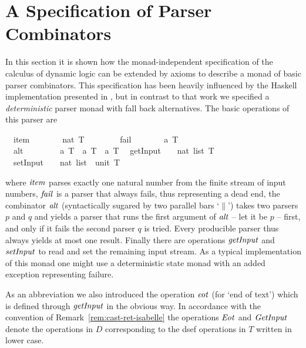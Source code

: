 \section{A Specification of Parser Combinators}
\label{sec:spec-pars-comb}

In this section it is shown how the monad-independent specification of the
calculus of dynamic logic can be extended by axioms to describe a monad of basic
parser combinators. This specification has been heavily influenced by the
Haskell implementation presented in \cite{HuttonMeijer96}, but in contrast to
that work we specified a \emph{deterministic} parser monad with fall back
alternatives.  The basic operations of this parser are
\begin{isabellebody}
\isanewline
{}\isanewline
\ \ item\ \ \ \ \ \ \ {\isacharcolon}{\isacharcolon}\ {\isachardoublequote}nat\ T{\isachardoublequote}\ \ \ \ \ \ %
\isanewline
\ \ fail\ \ \ \ \ \ \ {\isacharcolon}{\isacharcolon}\ {\isachardoublequote}{\isacharprime}a\ T{\isachardoublequote}\ \ \ \ \ \ \ %
\isanewline
\ \ alt\ \ \ \ \ \ \ \ {\isacharcolon}{\isacharcolon}\ {\isachardoublequote}{\isacharprime}a\ T\ {\isasymRightarrow}\ {\isacharprime}a\ T\ {\isasymRightarrow}\ {\isacharprime}a\ T{\isachardoublequote}\isanewline
\ \ getInput\ \ \ {\isacharcolon}{\isacharcolon}\ {\isachardoublequote}nat\ list\ T{\isachardoublequote}\ %
\isanewline
\ \ setInput\ \ \ {\isacharcolon}{\isacharcolon}\ {\isachardoublequote}nat\ list\ {\isasymRightarrow}\ unit\ T{\isachardoublequote}\ \isanewline
\end{isabellebody}
\noindent where $\mathit{item}$ parses exactly one natural number from the finite
stream of input numbers, $\mathit{fail}$ is a parser that always fails, thus
representing a dead end, the combinator $\mathit{alt}$ (syntactically sugared by two
parallel bars `$\|$') takes two parsers $p$ and $q$ and yields a parser that
runs the first argument of $\mathit{alt}$ -- let it be $p$ -- first, and only if it
fails the second parser $q$ is tried. Every producible parser thus always
yields at most one result. Finally there are operations $\mathit{getInput}$ and
$\mathit{setInput}$ to read and set the remaining input stream. As a typical
implementation of this monad one might use a deterministic state monad with
an added exception representing failure. 

As an abbreviation we also introduced the operation $\mathit{eot}$ (for `end of
text') which is defined through $\mathit{getInput}$ in the obvious way. In
accordance with the convention of Remark~\ref{rem:cast-ret-isabelle} the
operations $\mathit{Eot}$ and $\mathit{GetInput}$ denote the  operations in
$D$ corresponding to the dsef operations in $T$ written in lower case.


